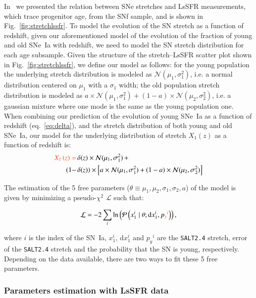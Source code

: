 \documentclass[]{aa} %
\newcommand{\nn}[1]{{\textcolor[rgb]{1, 0.27, 0}{#1}}}
\newcommand{\prob}[2]{\mathcal{P}\left( #1 \mid #2\right)}
\begin{document}
\nn{In~\cite{rigault2018} we presented the relation between SNe stretches and
LsSFR measurements, which trace progenitor age, from the SNf sample, and is
shown in Fig.~\ref{fig:stretchlssfr}}. To model the evolution of the SN stretch
as a function of redshift, given our aforementioned model of the evolution of
the fraction of young and old SNe~Ia with redshift, we need to model the SN
stretch distribution for each age subsample. Given the structure of the
stretch--LsSFR scatter plot shown in Fig.~\ref{fig:stretchlssfr}, we define our
model as follows: for the young population the underlying stretch distribution
is modeled as $\mathcal{N}(\mu_1, \sigma_1^2)$, i.e. a normal distribution
centered on $\mu_1$ with a $\sigma_1$ width; the old population stretch
distribution is modeled as $a\times \mathcal{N}(\mu_1, \sigma_1^2) + (1-a)\times
\mathcal{N}(\mu_2, \sigma_2^2)$, i.e. a gaussian mixture where one mode is the
same as the young population one. \nn{When combining our prediction of the
evolution of young SNe~Ia as a function of redshift (eq.~\ref{eq:delta}),
and the stretch distribution of both young and old SNe~Ia, our model for the
underlying distribution of stretch $X_1\left(z\right)$ as a function of
redshift is:}
\begin{align}
    \label{eq:stretchz}
    \nn{X_1\left(z \right) =
    }&\,\delta(z)\times\mathcal{N}(\mu_1,\sigma_1^2)\,+\nonumber\\
    (1-&\,\delta(z)) \times  \left[a\times\mathcal{N}(\mu_1,\sigma_1^2) +
    (1-a)\times\mathcal{N}(\mu_2,\sigma_2^2)\right]
\end{align}

The estimation of the 5 free parameters
($\theta\equiv{\mu_1,\mu_2,\sigma_1,\sigma_2,a}$) of the model is given by
minimizing a pseudo-$\chi^2$ $\mathcal{L}$ such that:

\begin{equation}
    \label{eq:likelihood}
    \mathcal{L} = -2 \sum_i \ln\left( \prob{x^{i}_{1}}{ \theta;
    \mathrm{d}x^{i}_{1}, p\nn{_y{}^i}}\right),
\end{equation}

\nn{where $i$ is the index of the SN~Ia, $x^{i}_{1}$, $\mathrm{d}x^{i}_{1}$ and
    $p_y{}^i$ are the \textsc{\texttt{SALT2.4}} stretch, error of the
    \textsc{\texttt{SALT2.4}} stretch and the probability that the SN is young,
    respectively. Depending on the data available, there are two ways to fit
these 5 free parameters}.

\subsubsection{\nn{Parameters estimation with LsSFR data}}
\label{sec:modelpy}
\end{document}
